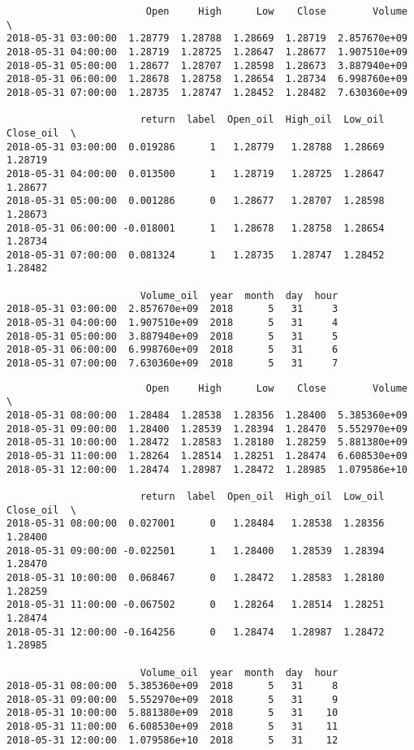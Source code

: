 \documentclass[11pt]{article}
\begin{document}
    
    \begin{verbatim}
                        Open     High      Low    Close        Volume  \
2018-05-31 03:00:00  1.28779  1.28788  1.28669  1.28719  2.857670e+09   
2018-05-31 04:00:00  1.28719  1.28725  1.28647  1.28677  1.907510e+09   
2018-05-31 05:00:00  1.28677  1.28707  1.28598  1.28673  3.887940e+09   
2018-05-31 06:00:00  1.28678  1.28758  1.28654  1.28734  6.998760e+09   
2018-05-31 07:00:00  1.28735  1.28747  1.28452  1.28482  7.630360e+09   

                       return  label  Open_oil  High_oil  Low_oil  Close_oil  \
2018-05-31 03:00:00  0.019286      1   1.28779   1.28788  1.28669    1.28719   
2018-05-31 04:00:00  0.013500      1   1.28719   1.28725  1.28647    1.28677   
2018-05-31 05:00:00  0.001286      0   1.28677   1.28707  1.28598    1.28673   
2018-05-31 06:00:00 -0.018001      1   1.28678   1.28758  1.28654    1.28734   
2018-05-31 07:00:00  0.081324      1   1.28735   1.28747  1.28452    1.28482   

                       Volume_oil  year  month  day  hour  
2018-05-31 03:00:00  2.857670e+09  2018      5   31     3  
2018-05-31 04:00:00  1.907510e+09  2018      5   31     4  
2018-05-31 05:00:00  3.887940e+09  2018      5   31     5  
2018-05-31 06:00:00  6.998760e+09  2018      5   31     6  
2018-05-31 07:00:00  7.630360e+09  2018      5   31     7  
    \end{verbatim}

    
    
    \begin{verbatim}
                        Open     High      Low    Close        Volume  \
2018-05-31 08:00:00  1.28484  1.28538  1.28356  1.28400  5.385360e+09   
2018-05-31 09:00:00  1.28400  1.28539  1.28394  1.28470  5.552970e+09   
2018-05-31 10:00:00  1.28472  1.28583  1.28180  1.28259  5.881380e+09   
2018-05-31 11:00:00  1.28264  1.28514  1.28251  1.28474  6.608530e+09   
2018-05-31 12:00:00  1.28474  1.28987  1.28472  1.28985  1.079586e+10   

                       return  label  Open_oil  High_oil  Low_oil  Close_oil  \
2018-05-31 08:00:00  0.027001      0   1.28484   1.28538  1.28356    1.28400   
2018-05-31 09:00:00 -0.022501      1   1.28400   1.28539  1.28394    1.28470   
2018-05-31 10:00:00  0.068467      0   1.28472   1.28583  1.28180    1.28259   
2018-05-31 11:00:00 -0.067502      0   1.28264   1.28514  1.28251    1.28474   
2018-05-31 12:00:00 -0.164256      0   1.28474   1.28987  1.28472    1.28985   

                       Volume_oil  year  month  day  hour  
2018-05-31 08:00:00  5.385360e+09  2018      5   31     8  
2018-05-31 09:00:00  5.552970e+09  2018      5   31     9  
2018-05-31 10:00:00  5.881380e+09  2018      5   31    10  
2018-05-31 11:00:00  6.608530e+09  2018      5   31    11  
2018-05-31 12:00:00  1.079586e+10  2018      5   31    12  
    \end{verbatim}
\end{document}
